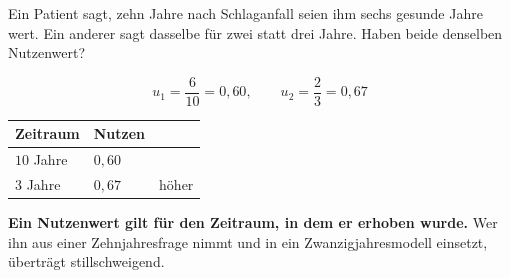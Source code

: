 \begin{aufgabe}
Ein Patient sagt, zehn Jahre nach Schlaganfall seien ihm sechs gesunde Jahre wert. Ein anderer sagt dasselbe für zwei statt drei Jahre. Haben beide denselben Nutzenwert?

\loesung
{}
\[ u_1 = \frac{6}{10} = 0{,}60, \qquad u_2 = \frac{2}{3} = 0{,}67 \]

\begin{center}
{\small
\renewcommand{\arraystretch}{1.48}
\begin{tabular}{@{}P{2.4cm}P{2.2cm}P{2.4cm}@{}}
\toprule
\textbf{Zeitraum} & \textbf{Nutzen} & \\
\midrule
$10$ Jahre & $0{,}60$ & \\
$3$ Jahre & $0{,}67$ & höher\\
\bottomrule
\end{tabular}}
\end{center}

\begin{center}
\begin{minipage}{0.88\textwidth}
\end{minipage}
\end{center}

\begin{center}
\begin{minipage}{0.9\textwidth}
\textbf{Ein Nutzenwert gilt für den Zeitraum, in dem er erhoben wurde.} Wer ihn aus einer Zehnjahresfrage nimmt und in ein Zwanzigjahresmodell einsetzt, überträgt stillschweigend.
\end{minipage}
\end{center}
\end{aufgabe}

